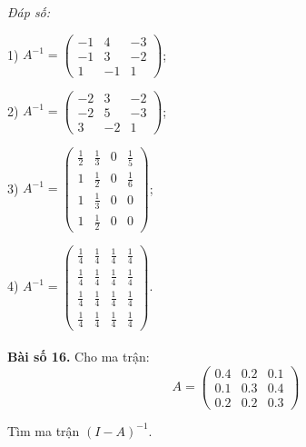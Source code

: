         \textit{Đáp số:}

        1) \(A^{-1} = \begin{pmatrix}
        -1 & 4 & -3 \\
        -1 & 3 & -2 \\
        1 & -1 & 1
        \end{pmatrix}\);\\
        \vspace*{0.5cm}

        2) \(A^{-1} = \begin{pmatrix}
        -2 & 3 & -2 \\
        -2 & 5 & -3 \\
        3 & -2 & 1
        \end{pmatrix}\);\\
        \vspace*{0.5cm}

        3) \(A^{-1} = \begin{pmatrix}
        \frac{1}{2} & \frac{1}{3} & 0 & \frac{1}{5} \\
        1 & \frac{1}{2} & 0 & \frac{1}{6} \\
        1 & \frac{1}{3} & 0 & 0 \\
        1 & \frac{1}{2} & 0 & 0
        \end{pmatrix}\);\\
        \vspace*{0.5cm}

        4) \(A^{-1} = \begin{pmatrix}
        \frac{1}{4} & \frac{1}{4} & \frac{1}{4} & \frac{1}{4} \\
        \frac{1}{4} & \frac{1}{4} & \frac{1}{4} & \frac{1}{4} \\
        \frac{1}{4} & \frac{1}{4} & \frac{1}{4} & \frac{1}{4} \\
        \frac{1}{4} & \frac{1}{4} & \frac{1}{4} & \frac{1}{4}
        \end{pmatrix}\).\\
        \vspace*{0.5cm}\\
\textbf{Bài số 16.} Cho ma trận:
        \[
        A = \begin{pmatrix}
        0.4 & 0.2 & 0.1 \\
        0.1 & 0.3 & 0.4 \\
        0.2 & 0.2 & 0.3
        \end{pmatrix}
        \]
        
        Tìm ma trận \((I - A)^{-1}\).
        
